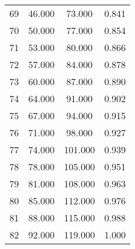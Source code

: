 \begin{tabular}{cccc}
  69 & 46.000 & 73.000 & 0.841 \\ 
  70 & 50.000 & 77.000 & 0.854 \\ 
  71 & 53.000 & 80.000 & 0.866 \\ 
  72 & 57.000 & 84.000 & 0.878 \\ 
  73 & 60.000 & 87.000 & 0.890 \\ 
  74 & 64.000 & 91.000 & 0.902 \\ 
  75 & 67.000 & 94.000 & 0.915 \\ 
  76 & 71.000 & 98.000 & 0.927 \\ 
  77 & 74.000 & 101.000 & 0.939 \\ 
  78 & 78.000 & 105.000 & 0.951 \\ 
  79 & 81.000 & 108.000 & 0.963 \\ 
  80 & 85.000 & 112.000 & 0.976 \\ 
  81 & 88.000 & 115.000 & 0.988 \\ 
  82 & 92.000 & 119.000 & 1.000 \\ 
   \hline
\end{tabular}
